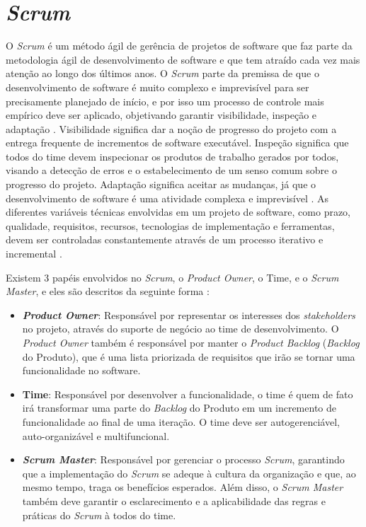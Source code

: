 \section{\textit{Scrum}}

O \textit{Scrum} é um método ágil de gerência de projetos de software que faz parte da metodologia ágil de desenvolvimento de software e que tem atraído cada vez mais atenção ao longo dos últimos anos. O \textit{Scrum} parte da premissa de que o desenvolvimento de software é muito complexo e imprevisível para ser precisamente planejado de início, e por isso um processo de controle mais empírico deve ser aplicado, objetivando garantir visibilidade, inspeção e adaptação \cite{scrum2005}. Visibilidade significa dar a noção de progresso do projeto com a entrega frequente de incrementos de software executável. Inspeção significa que todos do time devem inspecionar os produtos de trabalho gerados por todos, visando a detecção de erros e o estabelecimento de um senso comum sobre o progresso do projeto. Adaptação significa aceitar as mudanças, já que o desenvolvimento de software é uma atividade complexa e imprevisível \cite{agile2014}. As diferentes variáveis técnicas envolvidas em um projeto de software, como prazo, qualidade, requisitos, recursos, tecnologias de implementação e ferramentas,  devem ser controladas constantemente através de um processo iterativo e incremental \cite{scrum2005}.

Existem 3 papéis envolvidos no \textit{Scrum}, o \textit{Product Owner}, o Time, e o \textit{Scrum Master}, e eles são descritos da seguinte forma \cite{scrum2005}:

\begin{itemize}
\item \textbf{\textit{Product Owner}}: Responsável por representar os interesses dos \textit{stakeholders} no projeto, através do suporte de negócio ao time de desenvolvimento. O \textit{Product Owner} também é responsável por manter o \textit{Product Backlog} (\textit{Backlog} do Produto), que é uma lista priorizada de requisitos que irão se tornar uma funcionalidade no software.

\item \textbf{Time}: Responsável por desenvolver a funcionalidade, o time é quem de fato irá transformar uma parte do \textit{Backlog} do Produto em um incremento de funcionalidade ao final de uma iteração. O time deve ser autogerenciável, auto-organizável e multifuncional.

\item \textbf{\textit{Scrum Master}}: Responsável por gerenciar o processo \textit{Scrum}, garantindo que a implementação do \textit{Scrum} se adeque à cultura da organização e que, ao mesmo tempo, traga os benefícios esperados. Além disso, o \textit{Scrum Master} também deve garantir o esclarecimento e a aplicabilidade das regras e práticas do \textit{Scrum} à todos do time.
\end{itemize}

